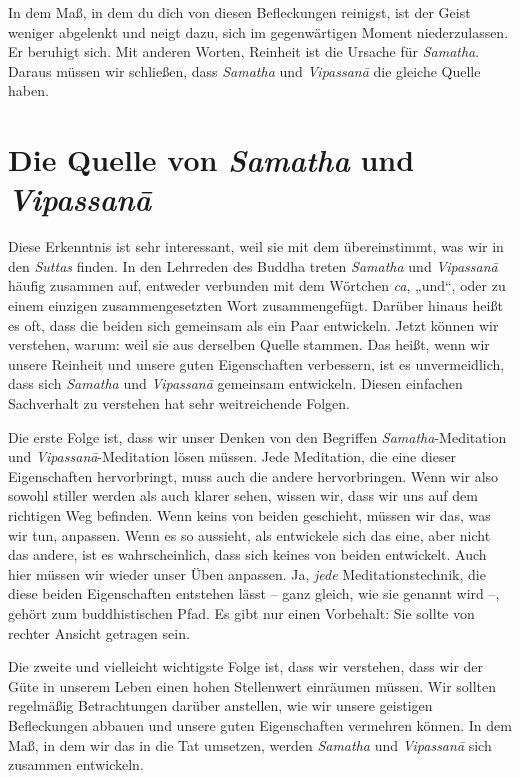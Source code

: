 \documentclass[12pt,openany]{book}
\begin{document}
In dem Maß, in dem du dich von diesen Befleckungen reinigst, ist der Geist weniger abgelenkt und neigt dazu, sich im gegenwärtigen Moment niederzulassen. Er beruhigt sich. Mit anderen Worten, Reinheit ist die Ursache für \textit{Samatha}. Daraus müssen wir schließen, dass \textit{Samatha} und \textit{Vipas\-sanā} die gleiche Quelle haben.

\chapter*{Die Quelle von \textit{Samatha} und \textit{Vipas\-sanā}}

Diese Erkenntnis ist sehr interessant, weil sie mit dem übereinstimmt, was wir in den \textit{Suttas} finden. In den Lehrreden des Buddha treten \textit{Samatha} und \textit{Vipas\-sanā} häufig zusammen auf, entweder verbunden mit dem Wörtchen \textit{ca}, „und“, oder zu einem einzigen zusammengesetzten Wort zusammengefügt. Darüber hinaus heißt es oft, dass die beiden sich gemeinsam als ein Paar entwickeln. Jetzt können wir verstehen, warum: weil sie aus derselben Quelle stammen. Das heißt, wenn wir unsere Reinheit und unsere guten Eigenschaften verbessern, ist es unvermeidlich, dass sich \textit{Samatha} und \textit{Vipas\-sanā} gemeinsam entwickeln. Diesen einfachen Sachverhalt zu verstehen hat sehr weitreichende Folgen.

Die erste Folge ist, dass wir unser Denken von den Begriffen \textit{Samatha}-Meditation und \textit{Vipas\-sanā}-Meditation lösen müssen. Jede Meditation, die eine dieser Eigenschaften hervorbringt, muss auch die andere hervorbringen. Wenn wir also sowohl stiller werden als auch klarer sehen, wissen wir, dass wir uns auf dem richtigen Weg befinden. Wenn keins von beiden geschieht, müssen wir das, was wir tun, anpassen. Wenn es so aussieht, als entwickele sich das eine, aber nicht das andere, ist es wahrscheinlich, dass sich keines von beiden entwickelt. Auch hier müssen wir wieder unser Üben anpassen. Ja, \textit{jede} Meditationstechnik, die diese beiden Eigenschaften entstehen lässt – ganz gleich, wie sie genannt wird –, gehört zum buddhistischen Pfad. Es gibt nur einen Vorbehalt: Sie sollte von rechter Ansicht getragen sein.

Die zweite und vielleicht wichtigste Folge ist, dass wir verstehen, dass wir der Güte in unserem Leben einen hohen Stellenwert einräumen müssen. Wir sollten regelmäßig Betrachtungen da\-rüber anstellen, wie wir unsere geistigen Befleckungen abbauen und unsere guten Eigenschaften vermehren können. In dem Maß, in dem wir das in die Tat umsetzen, werden \textit{Samatha} und \textit{Vipas\-sanā} sich zusammen entwickeln.
\end{document}
